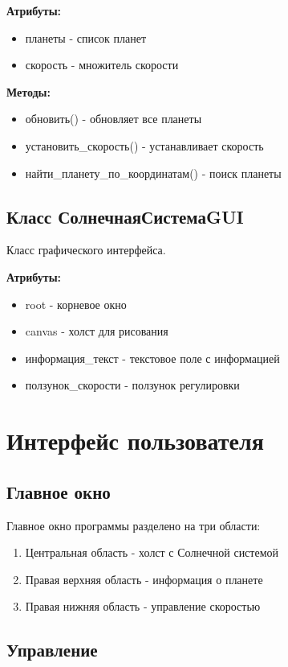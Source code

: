 \documentclass[12pt,a4paper]{article}
\begin{document}
\textbf{Атрибуты:}
\begin{itemize}
    \item планеты - список планет
    \item скорость - множитель скорости
\end{itemize}

\textbf{Методы:}
\begin{itemize}
    \item обновить() - обновляет все планеты
    \item установить\_скорость() - устанавливает скорость
    \item найти\_планету\_по\_координатам() - поиск планеты
\end{itemize}

\subsection{Класс СолнечнаяСистемаGUI}

Класс графического интерфейса.

\textbf{Атрибуты:}
\begin{itemize}
    \item root - корневое окно
    \item canvas - холст для рисования
    \item информация\_текст - текстовое поле с информацией
    \item ползунок\_скорости - ползунок регулировки
\end{itemize}

\section{Интерфейс пользователя}

\subsection{Главное окно}

Главное окно программы разделено на три области:
\begin{enumerate}
    \item Центральная область - холст с Солнечной системой
    \item Правая верхняя область - информация о планете
    \item Правая нижняя область - управление скоростью
\end{enumerate}

\subsection{Управление}
\end{document}
